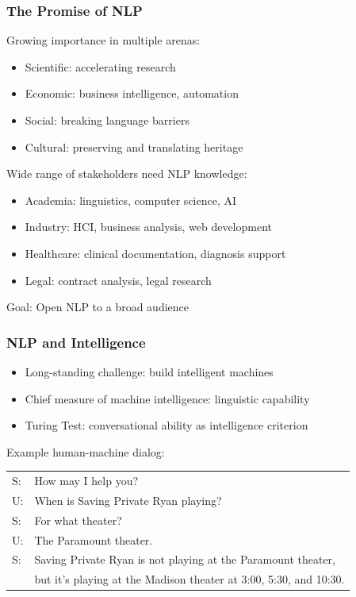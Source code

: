 \begin{frame}[fragile]\frametitle{The Promise of NLP}
Growing importance in multiple arenas:
\begin{itemize}
\item Scientific: accelerating research
\item Economic: business intelligence, automation
\item Social: breaking language barriers
\item Cultural: preserving and translating heritage
\end{itemize}

Wide range of stakeholders need NLP knowledge:
\begin{itemize}
\item Academia: linguistics, computer science, AI
\item Industry: HCI, business analysis, web development
\item Healthcare: clinical documentation, diagnosis support
\item Legal: contract analysis, legal research
\end{itemize}

Goal: Open NLP to a broad audience
\end{frame}

\begin{frame}[fragile]\frametitle{NLP and Intelligence}
\begin{itemize}
\item Long-standing challenge: build intelligent machines
\item Chief measure of machine intelligence: linguistic capability
\item Turing Test: conversational ability as intelligence criterion
\end{itemize}

Example human-machine dialog:
\small
\begin{tabular}{ll}
S: & How may I help you?\\
U: & When is Saving Private Ryan playing?\\
S: & For what theater?\\
U: & The Paramount theater.\\
S: & Saving Private Ryan is not playing at the Paramount theater,\\
   & but it's playing at the Madison theater at 3:00, 5:30, and 10:30.
\end{tabular}
\end{frame}

